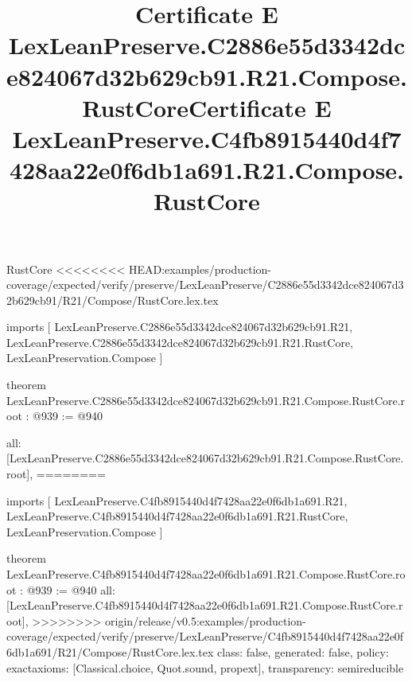 \begin{lexlean}{RustCore}
<<<<<<<< HEAD:examples/production-coverage/expected/verify/preserve/LexLeanPreserve/C2886e55d3342dce824067d32b629cb91/R21/Compose/RustCore.lex.tex
\title{Certificate E LexLeanPreserve.C2886e55d3342dce824067d32b629cb91.R21.Compose.RustCore}
\begin{coremodule}
imports [
  LexLeanPreserve.C2886e55d3342dce824067d32b629cb91.R21,
  LexLeanPreserve.C2886e55d3342dce824067d32b629cb91.R21.RustCore,
  LexLeanPreservation.Compose
]

theorem LexLeanPreserve.C2886e55d3342dce824067d32b629cb91.R21.Compose.RustCore.root : @939 := @940 {
  all: [LexLeanPreserve.C2886e55d3342dce824067d32b629cb91.R21.Compose.RustCore.root],
========
\title{Certificate E LexLeanPreserve.C4fb8915440d4f7428aa22e0f6db1a691.R21.Compose.RustCore}
\begin{coremodule}
imports [
  LexLeanPreserve.C4fb8915440d4f7428aa22e0f6db1a691.R21,
  LexLeanPreserve.C4fb8915440d4f7428aa22e0f6db1a691.R21.RustCore,
  LexLeanPreservation.Compose
]

theorem LexLeanPreserve.C4fb8915440d4f7428aa22e0f6db1a691.R21.Compose.RustCore.root : @939 := @940 {
  all: [LexLeanPreserve.C4fb8915440d4f7428aa22e0f6db1a691.R21.Compose.RustCore.root],
>>>>>>>> origin/release/v0.5:examples/production-coverage/expected/verify/preserve/LexLeanPreserve/C4fb8915440d4f7428aa22e0f6db1a691/R21/Compose/RustCore.lex.tex
  class: false,
  generated: false,
  policy: exact{axioms: [Classical.choice, Quot.sound, propext]},
  transparency: semireducible
}


\end{coremodule}}
\end{coremodule}
\end{lexlean}
